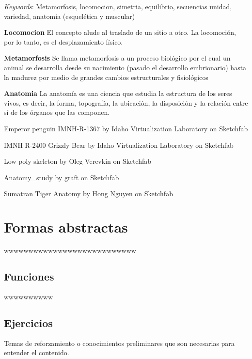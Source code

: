\documentclass[16pt,]{krantz}
\theoremstyle{definition}
\theoremstyle{definition}
\theoremstyle{definition}
\theoremstyle{definition}
\theoremstyle{remark}
\begin{document}
\emph{Keywords}: Metamorfosis, locomocion, simetria, equilibrio, secuencias unidad, variedad, anatomia (esquelética y muscular)

\textbf{Locomocion} El concepto alude al traslado de un sitio a otro. La locomoción, por lo tanto, es el desplazamiento físico.

\textbf{Metamorfosis} Se llama metamorfosis a un proceso biológico por el cual un animal se desarrolla desde su nacimiento (pasado el desarrollo embrionario) hasta la madurez por medio de grandes cambios estructurales y fisiológicos

\textbf{Anatomia} La anatomía es una ciencia que estudia la estructura de los seres vivos, es decir, la forma, topografía, la ubicación, la disposición y la relación entre sí de los órganos que las componen.

Emperor penguin IMNH-R-1367 by Idaho Virtualization Laboratory on Sketchfab

IMNH R-2400 Grizzly Bear by Idaho Virtualization Laboratory on Sketchfab

Low poly skeleton by Oleg Verevkin on Sketchfab

Anatomy\_study by graft on Sketchfab

Sumatran Tiger Anatomy by Hong Nguyen on Sketchfab

\hypertarget{formas-abstractas}{%
\chapter{Formas abstractas}\label{formas-abstractas}}

wwwwwwwwwwwwwwwwwwwwwwwwwww

\hypertarget{funciones}{%
\section{Funciones}\label{funciones}}

wwwwwwwwww \citep{vincze2014college}

\hypertarget{ejercicios}{%
\section{Ejercicios}\label{ejercicios}}

\hypertarget{appendix-apendice}{%
\appendix {}}


Temas de reforzamiento o conocimientos preliminares que son necesarias para entender el contenido.
\end{document}
